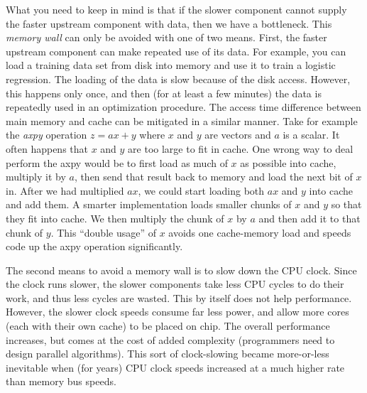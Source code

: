 What you need to keep in mind is that if the slower component cannot supply the faster upstream component with data, then we have a bottleneck.  This \emph{memory wall} can only be avoided with one of two means.  First, the faster upstream component can make repeated use of its data.  For example, you can load a training data set from disk into memory and use it to train a logistic regression.  The loading of the data is slow because of the disk access.  However, this happens only once, and then (for at least a few minutes) the data is repeatedly used in an optimization procedure.  The access time difference between main memory and cache can be mitigated in a similar manner.  
Take for example the \emph{axpy} operation $z = ax + y$ where $x$ and $y$ are vectors and $a$ is a scalar.  It often happens that $x$ and $y$ are too large to fit in cache.  One wrong way to deal perform the axpy would be to first load as much of $x$ as possible into cache, multiply it by $a$, then send that result back to memory and load the next bit of $x$ in.  After we had multiplied $ax$, we could start loading both $ax$ and $y$ into cache and add them.  A smarter implementation loads smaller chunks of $x$ and $y$ so that they fit into cache.  We then multiply the chunk of $x$ by $a$ and then add it to that chunk of $y$.  This ``double usage'' of $x$ avoids one cache-memory load and speeds code up the axpy operation significantly.

The second means to avoid a memory wall is to slow down the CPU clock.  Since the clock runs slower, the slower components take less CPU cycles to do their work, and thus less cycles are wasted.  This by itself does not help performance.  However, the slower clock speeds consume far less power, and allow more cores (each with their own cache) to be placed on chip.  The overall performance increases, but comes at the cost of added complexity (programmers need to design parallel algorithms).  This sort of clock-slowing became more-or-less inevitable when (for years) CPU clock speeds increased at a much higher rate than memory bus speeds.

